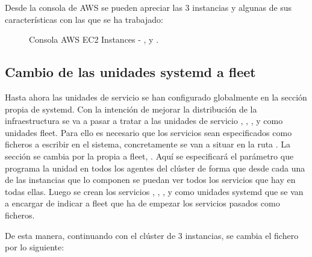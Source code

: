 Desde la consola de AWS se pueden apreciar las 3 instancias y algunas de sus características con las que se ha trabajado:

\begin{figure}[H]
\caption{Consola AWS EC2 Instances - ,  y .\label{fig:figure_placement_example}}
\end{figure}

\subsection{Cambio de las unidades systemd a fleet}

Hasta ahora las unidades de servicio se han configurado globalmente en la sección propia de systemd. Con la intención de mejorar la distribución de la infraestructura se va a pasar a tratar a las unidades de servicio , , ,  y  como unidades fleet. Para ello es necesario que los servicios sean especificados como ficheros a escribir en el sistema, concretamente se van a situar en la ruta . La sección \kode{[Install]} se cambia por la propia a fleet, . Aquí se especificará el parámetro  que programa la unidad en todos los agentes del clúster de forma que desde cada una de las instancias que lo componen se puedan ver todos los servicios que hay en todas ellas. Luego se crean los servicios , , ,  y  como unidades systemd que se van a encargar de indicar a fleet que ha de empezar los servicios pasados como ficheros. 

De esta manera, continuando con el clúster de 3 instancias, se cambia el fichero  por lo siguiente:

